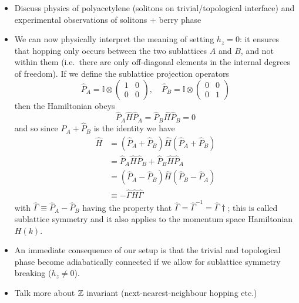 {\color{blue}
\begin{itemize}
	\item Discuss physics of polyacetylene (solitons on trivial/topological interface) and experimental observations of solitons + berry phase \cites{Meier_SSH-soliton}{Atala_SSH-Zak}
	
	\item We can now physically interpret the meaning of setting $h_z = 0$: it ensures that hopping only occurs between the two sublattices $A$ and $B$, and not within them (i.e.\ there are only off-diagonal elements in the internal degrees of freedom). If we define the sublattice projection operators
	\[
		\hat{P}_A = \mathbb{I} \otimes \begin{pmatrix}
			1 & 0 \\ 0 & 0
		\end{pmatrix},\quad \hat{P}_B = \mathbb{I} \otimes \begin{pmatrix}
			0 & 0 \\ 0 & 1
		\end{pmatrix}
	\]
	then the Hamiltonian obeys
	\[
		\hat{P}_A\hat{H}\hat{P}_A = \hat{P}_B\hat{H}\hat{P}_B = 0
	\]
	and so since $\hat{P}_A + \hat{P}_B$ is the identity we have
	\begin{align*}
		\hat{H} &= (\hat{P}_A + \hat{P}_B)\hat{H}(\hat{P}_A + \hat{P}_B) \\
			&= \hat{P}_A\hat{H}\hat{P}_B + \hat{P}_B\hat{H}\hat{P}_A \\
			&= (\hat{P}_A - \hat{P}_B)\hat{H}(\hat{P}_B - \hat{P}_A) \\
			&\equiv -\hat{\Gamma}\hat{H}\hat{\Gamma}
	\end{align*}
	with $\hat{\Gamma}\equiv\hat{P}_A - \hat{P}_B$ having the property that $\hat{\Gamma} = \hat{\Gamma}^{-1} = \hat{\Gamma}\dagger$; this is called sublattice symmetry and it also applies to the momentum space Hamiltonian $H(k)$.
	
	\item An immediate consequence of our setup is that the trivial and topological phase become adiabatically connected if we allow for sublattice symmetry breaking ($h_z \neq 0$).
	
	\item Talk more about $\mathbb{Z}$ invariant (next-nearest-neighbour hopping etc.)
\end{itemize}
}

%
%	
%	



